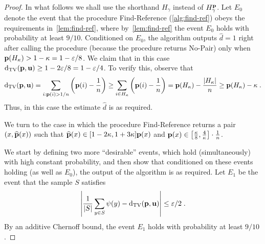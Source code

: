 \begin{proof}
In what follows we shall use the shorthand $H_\gamma$ instead of
$H^{\mathbf{p}}_\gamma$.
 Let $E_0$ denote the event that
the procedure {\sc Find-Reference} (\cref{alg:find-ref}) obeys the
requirements in~\cref{lem:find-ref}, where
by~\cref{lem:find-ref} the event $E_0$ holds
with  probability at least $9/10$. Conditioned
on $E_0$, the algorithm outputs $\hat{d} = 1$
right after calling the procedure (because the procedure returns
{\sf No-Pair}) only when $\mathbf{p}(H_\kappa) > 1-\kappa = 1-\varepsilon/8$.
We claim that in this case $\operatorname{d}_{\rm{TV}}(\mathbf{p},\mathbf{u}) \geq 1-2\varepsilon/8=1-\varepsilon/4$.
To verify this, observe that
\begin{equation}
\operatorname{d}_{\rm{TV}}(\mathbf{p},\mathbf{u}) = \sum_{i: \mathbf{p}(i)>1/n}\left(\mathbf{p}(i) - \frac{1}{n}\right) \geq \sum_{i \in H_\kappa} \left(\mathbf{p}(i) - \frac{1}{n}\right) 
= \mathbf{p}(H_\kappa) - \frac{|H_\kappa|}{n} \geq \mathbf{p}(H_\kappa) - \kappa\;.
\end{equation}
Thus, in this case the estimate $\hat{d}$ is as required.

We turn to the case in which the
procedure {\sc Find-Reference} returns a pair $(x,\widehat{\mathbf{p}}(x))$
such that $\widehat{\mathbf{p}}(x) \in [1-2\kappa,1+3\kappa]\mathbf{p}(x)$ and
$\mathbf{p}(x) \in \left[\frac{\kappa}{8},\frac{4}{\kappa}\right]\cdot \frac{1}{n}$.

We start by defining two more ``desirable'' events, which
hold (simultaneously) with high constant probability, and
then show that conditioned on these events holding (as well as $E_0$),
the output of the algorithm is as required.
Let $E_1$ be the event that the sample $S$ satisfies
\begin{equation}\label{eq:samp-S-eps}
\left|\frac{1}{|S|}\sum_{y\in S} \psi(y)- \operatorname{d}_{\rm{TV}}(\mathbf{p},\mathbf{u})\right|
\leq \varepsilon/2\;.
\end{equation}
By an additive Chernoff bound, the event $E_1$ holds with probability
at least $9/10$.



\end{proof}

